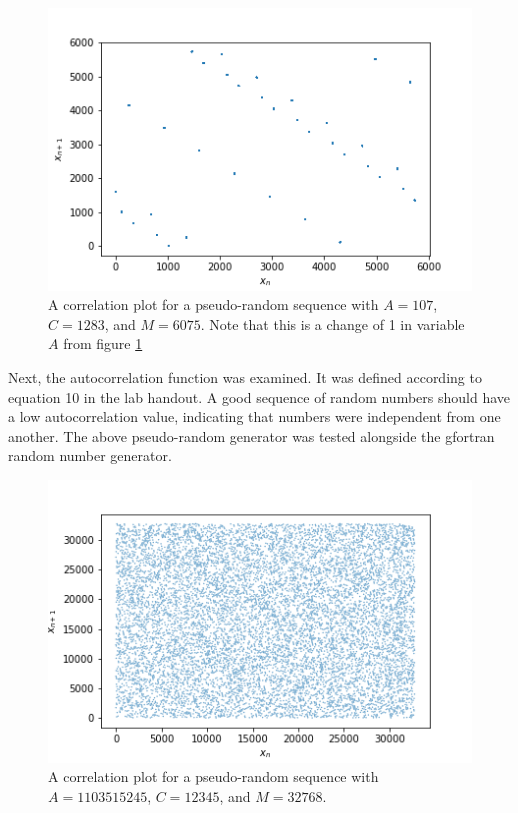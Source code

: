 \documentclass[twocolumn]{article}
\begin{document}
\begin{figure}[h]
	\centering
	\includegraphics[width=\linewidth]{fig2}
	\caption{A correlation plot for a pseudo-random sequence with $A=107$, $C=1283$, and $M=6075$. Note that this is a change of 1 in variable $A$ from figure \ref{fig:fig2}}
	\label{fig:fig2}
\end{figure}

Next, the autocorrelation function was examined. It was defined according to equation 10 in the lab handout. A good sequence of random numbers should have a low autocorrelation value, indicating that numbers were independent from one another. The above pseudo-random generator was tested alongside the gfortran random number generator.

\begin{figure}[H]
	\centering
	\includegraphics[width=\linewidth]{fig3}
	\caption{A correlation plot for a pseudo-random sequence with $A=1103515245$, $C=12345$, and $M=32768$.}
	\label{fig:fig3}
\end{figure}
\end{document}
